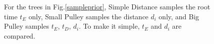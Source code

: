 \documentclass{bmcart}
\begin{document}
\begin{backmatter}
\begin{figure}[h!]
\centering
{}
\caption{
             For the trees in Fig.\ref{sampleprior}, Simple Distance samples the root time $t_E$ only, Small Pulley samples the distance $d_i$ only, and Big Pulley samples $t_E$, $t_D$, $d_i$. To make it simple, $t_E$ and $d_i$ are compared.}
\label{res_roo1}
\end{figure}


\end{backmatter}
\end{document}
